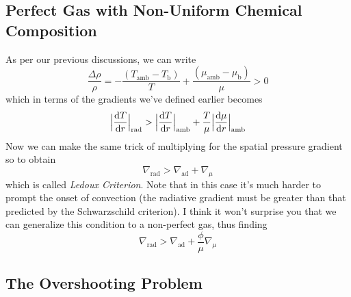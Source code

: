 \subsection*{Perfect Gas with Non-Uniform Chemical Composition}
As per our previous discussions, we can write 
\begin{equation*}
	\frac{\Delta\rho}{\rho} = -\frac{(T_{\text{amb}}-T_{\text{b}})}{T}+\frac{(\mu_{\text{amb}}-\mu_{\text{b}})}{\mu} > 0
\end{equation*}
which in terms of the gradients we've defined earlier becomes 
\begin{equation*}
	\Big|\frac{\text{d}T}{\text{d}r}\Big|_{\text{rad}} > \Big|\frac{\text{d}T}{\text{d}r}\Big|_{\text{amb}} + \frac{T}{\mu}\Big|\frac{\text{d}\mu}{\text{d}r}\Big|_{\text{amb}} 
\end{equation*}
Now we can make the same trick of multiplying for the spatial pressure gradient so to obtain
\begin{equation}
	\nabla_{\text{rad}} > \nabla_{\text{ad}} + \nabla_{\mu}
	\label{eq:ledouxcriterion}
\end{equation}
which is called \emph{Ledoux Criterion}. Note that in this case it's much harder to prompt the onset of convection (the radiative gradient must be greater than that predicted by the Schwarzschild criterion). I think it won't surprise you that we can generalize this condition to a non-perfect gas, thus finding 
\begin{equation*}
	\nabla_{\text{rad}} > \nabla_{\text{ad}} + \frac{\phi}{\mu}\nabla_{\mu}
\end{equation*}

\subsection{The Overshooting Problem}

